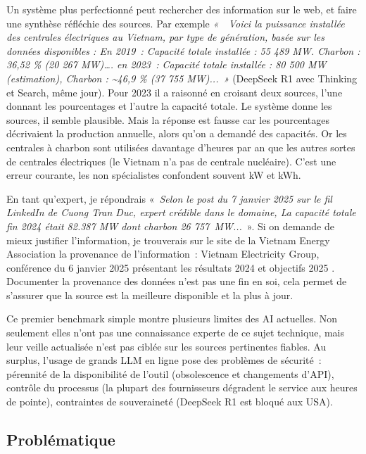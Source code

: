 \documentclass[a4paper,11pt]{report}
\begin{document}
Un système plus perfectionné peut rechercher des information sur le web, et faire une synthèse réfléchie des sources. Par exemple \emph{\emph{«~~}Voici la puissance installée des centrales électriques au Vietnam, par type de génération, basée sur les données disponibles : \emph{En 2019~: Capacité totale installée : 55 489 MW. Charbon : 36,52 \% (20 267 MW)\ldots. }\emph{e}\emph{n 2023~: }\emph{C}\emph{apacité totale installée : 80 500 MW (estimation), Charbon : \textasciitilde46,9 \% (37 755 MW)...~»}} (DeepSeek R1 avec Thinking et Search, même jour). Pour 2023 il a raisonné en croisant deux sources, l'une donnant les pourcentages et l'autre la capacité totale. Le système donne les sources, il semble plausible. Mais la réponse est fausse car les pourcentages décrivaient la production annuelle, alors qu'on a demandé des capacités. Or les centrales à charbon sont utilisées davantage d'heures par an que les autres sortes de centrales électriques (le Vietnam n'a pas de centrale nucléaire). C'est une erreur courante, les non spécialistes confondent souvent kW et kWh.

En tant qu'expert, je répondrais «~\emph{\emph{Selon le post du 7 janvier 2025 sur le fil LinkedIn de Cuong Tran Duc, expert crédible dans le domaine, La capacité totale fin 2024 était 82.387 MW dont charbon 26 757~MW...}}~». Si on demande de mieux justifier l'information, je trouverais sur le site de la Vietnam Energy Association la provenance de l'information~: Vietnam Electricity Group, conférence du 6 janvier 2025 présentant les résultats 2024 et objectifs 2025 \citep{DVW38BYR}. Documenter la provenance des données n'est pas une fin en soi, cela permet de s'assurer que la source est la meilleure disponible et la plus à jour.

Ce premier benchmark simple montre plusieurs limites des AI actuelles. Non seulement elles n'ont pas une connaissance experte de ce sujet technique, mais leur veille actualisée n'est pas ciblée sur les sources pertinentes fiables. Au surplus, l'usage de grands LLM en ligne pose des problèmes de sécurité~: pérennité de la disponibilité de l'outil (obsolescence et changements d'API), contrôle du processus (la plupart des fournisseurs dégradent le service aux heures de pointe), contraintes de souveraineté (DeepSeek R1 est bloqué aux USA).

\subsection{Problématique}\label{probluxe9matique}
\end{document}
